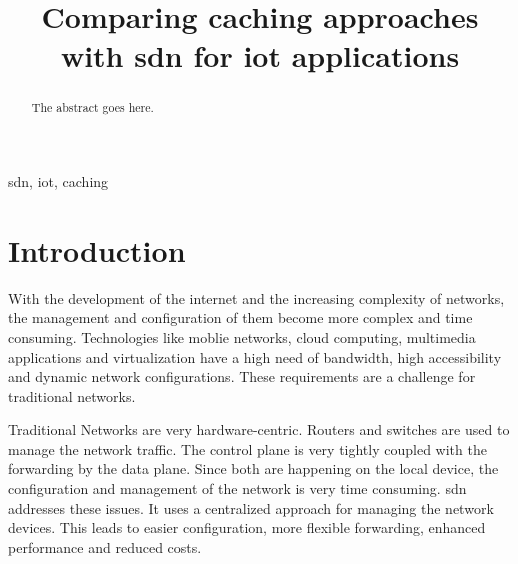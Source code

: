 \documentclass[conference]{IEEEtran}
\begin{document}
	\title{Comparing caching approaches with \ac{sdn} for \ac{iot} applications}


	\author{
		}

	\maketitle

	\begin{abstract}
	The abstract goes here.
	\end{abstract}

	\begin{IEEEkeywords}
	\ac{sdn}, \ac{iot}, caching
	\end{IEEEkeywords}

	\IEEEpeerreviewmaketitle

	\section{Introduction}
	\label{section:introduction}

	With the development of the internet and the increasing complexity of networks, the management and configuration of them become more complex and time consuming. Technologies like moblie networks, cloud computing, multimedia applications and virtualization have a high need of bandwidth, high accessibility and dynamic network configurations. These requirements are a challenge for traditional networks. 

	Traditional Networks are very hardware-centric. Routers and switches are used to manage the network traffic. The control plane is very tightly coupled with the forwarding by the data plane. Since both are happening on the local device, the configuration and management of the network is very time consuming. \acf{sdn} addresses these issues. It uses a centralized approach for managing the network devices. This leads to easier configuration, more flexible forwarding, enhanced performance and reduced costs. \cite{Jefia2018-pj} \cite{MASOUDI20161}
\end{document}
